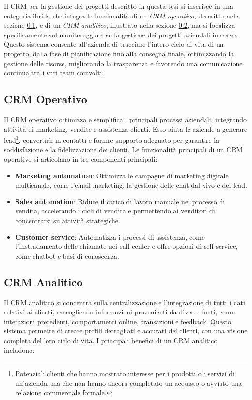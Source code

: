 \documentclass[target=bach,aauheader=,style=]{thud}
\begin{document}
\noindent Il CRM per la gestione dei progetti descritto in questa tesi si inserisce in una categoria ibrida che integra le funzionalità di un \textit{CRM operativo}, descritto nella sezione \ref{CRM_operativo}, e di un \textit{CRM analitico}, illustrato nella sezione \ref{CRM_analitico}, ma si focalizza specificamente sul monitoraggio e sulla gestione dei progetti aziendali in corso. Questo sistema consente all'azienda di tracciare l'intero ciclo di vita di un progetto, dalla fase di pianificazione fino alla consegna finale, ottimizzando la gestione delle risorse, migliorando la trasparenza e favorendo una comunicazione continua tra i vari team coinvolti.

\subsection{CRM Operativo}\label{CRM_operativo} 
Il CRM operativo ottimizza e semplifica i principali processi aziendali, integrando attività di marketing, vendite e assistenza clienti. Esso aiuta le aziende a generare lead\footnote{Potenziali clienti che hanno mostrato interesse per i prodotti o i servizi di un'azienda, ma che non hanno ancora completato un acquisto o avviato una relazione commerciale formale.}, convertirli in contatti e fornire supporto adeguato per garantire la soddisfazione e la fidelizzazione dei clienti. Le funzionalità principali di un CRM operativo si articolano in tre componenti principali:

\begin{itemize} 
    \item \textbf{Marketing automation}: Ottimizza le campagne di marketing digitale multicanale, come l'email marketing, la gestione delle chat dal vivo e dei lead. 
    \item \textbf{Sales automation}: Riduce il carico di lavoro manuale nel processo di vendita, accelerando i cicli di vendita e permettendo ai venditori di concentrarsi su attività strategiche. 
    \item \textbf{Customer service}: Automatizza i processi di assistenza, come l'instradamento delle chiamate nei call center e offre opzioni di self-service, come chatbot e basi di conoscenza. 
\end{itemize}

\subsection{CRM Analitico}\label{CRM_analitico} 
Il CRM analitico si concentra sulla centralizzazione e l'integrazione di tutti i dati relativi ai clienti, raccogliendo informazioni provenienti da diverse fonti, come interazioni precedenti, comportamenti online, transazioni e feedback. Questo sistema permette di creare profili dettagliati e accurati dei clienti, con una visione completa del loro ciclo di vita. I principali benefici di un CRM analitico includono:
\end{document}
